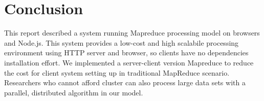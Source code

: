 \section{Conclusion}

This report described a system running Mapreduce processing model on browsers and Node.js. This system provides a low-cost and high scalabile processing environment using HTTP server and browser, so clients have no dependencies installation effort.
We implemented a server-client version Mapreduce to reduce the cost for client system setting up in traditional MapReduce scenario. Researchers who cannot afford cluster can also process large data sets with a parallel, distributed algorithm in our model.